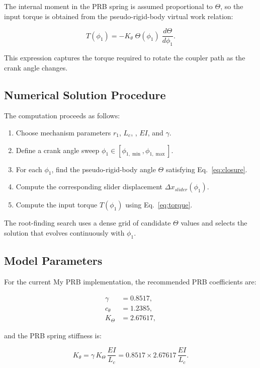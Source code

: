 \documentclass[colorlinks,upint,subscriptcorrection,varvw,hyphenate]{asmeconf}
\begin{document}
The internal moment in the PRB spring is assumed proportional to $\Theta$, so the input torque is obtained from the pseudo-rigid-body virtual work relation:

\begin{equation}
    T(\phi_1) = -K_{\theta} \; \Theta(\phi_1) \; \frac{d\Theta}{d\phi_1}.
    \label{eq:torque}
\end{equation}

This expression captures the torque required to rotate the coupler path as the crank angle changes.

\subsection{Numerical Solution Procedure}

The computation proceeds as follows:

\begin{enumerate}
  \item Choose mechanism parameters $r_1$, $L_c$, , $EI$, and $\gamma$.
  \item Define a crank angle sweep $\phi_1 \in [\phi_{1,\min}, \phi_{1,\max}]$.
  \item For each $\phi_1$, find the pseudo-rigid-body angle $\Theta$ satisfying Eq.~\eqref{eq:closure}.
  \item Compute the corresponding slider displacement $\Delta x_{slider}(\phi_1)$.
  \item Compute the input torque $T(\phi_1)$ using Eq.~\eqref{eq:torque}.
\end{enumerate}

The root-finding search uses a dense grid of candidate $\Theta$ values and selects the solution that evolves continuously with $\phi_1$.

\subsection{Model Parameters}

For the current My PRB implementation, the recommended PRB coefficients are:

\begin{align}
    \gamma &= 0.8517, \\
    c_{\theta} &= 1.2385, \\
    K_{\Theta} &= 2.67617,
\end{align}

and the PRB spring stiffness is:

\begin{equation}
    K_{\theta} = \gamma \, K_{\Theta} \, \frac{EI}{L_c} = 0.8517 \times 2.67617 \, \frac{EI}{L_c}.
\end{equation}
\end{document}
